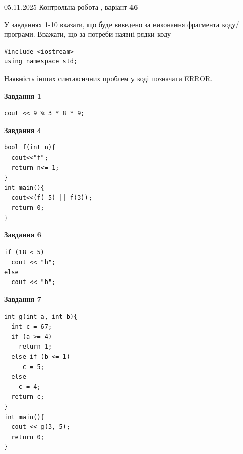 \documentclass[12pt, ukrainian]{article}
\begin{document}
{\Large{05.11.2025 Контрольна робота , варіант  \No \textbf { 46 }\par}}
{
\begin {large}
У завданнях 1-10 вказати, що буде виведено за виконання фрагмента коду/про\-гра\-ми.
Вважати, що за потреби наявні рядки коду
\begin{verbatim}
#include <iostream>
using namespace std;
\end{verbatim}
Наявність інших синтаксичних проблем у коді позначати ERROR.

\begin{minipage}[t]{7.0cm}

\begin{center}
\textbf{Завдання 1}
\end{center}
\vspace{-8mm}

\begin{verbatim}
cout << 9 % 3 * 8 * 9;
\end{verbatim}



\begin{center}
\textbf{Завдання 4}
\end{center}
\vspace{-8mm}

\begin{verbatim}
bool f(int n){
  cout<<"f";
  return n<=-1;
}
int main(){
  cout<<(f(-5) || f(3));
  return 0;
}
\end{verbatim}



\begin{center}
\textbf{Завдання 6}
\end{center}
\vspace{-8mm}

\begin{verbatim}
if (18 < 5)
  cout << "h";
else
  cout << "b";
\end{verbatim}



\begin{center}
\textbf{Завдання 7}
\end{center}
\vspace{-8mm}

\begin{verbatim}
int g(int a, int b){
  int c = 67;
  if (a >= 4)
    return 1;
  else if (b <= 1)
     c = 5;
  else
    c = 4;
  return c;
}
int main(){
  cout << g(3, 5);
  return 0;
}
\end{verbatim}


\end{minipage}
\end{large}}
\end{document}
